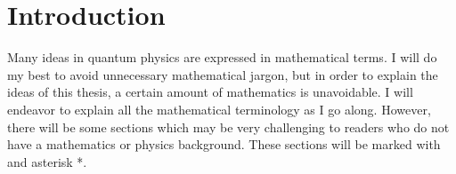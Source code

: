 \chapter{Introduction}
Many ideas in quantum physics are expressed in mathematical terms. I will do my best to avoid unnecessary mathematical jargon, but in order to explain the ideas of this thesis, a certain amount of mathematics is unavoidable. I will endeavor to explain all the mathematical terminology as I go along. However, there will be some sections which may be very challenging to readers who do not have a mathematics or physics background. These sections will be marked with and asterisk *.\label{asteriskmeaning}